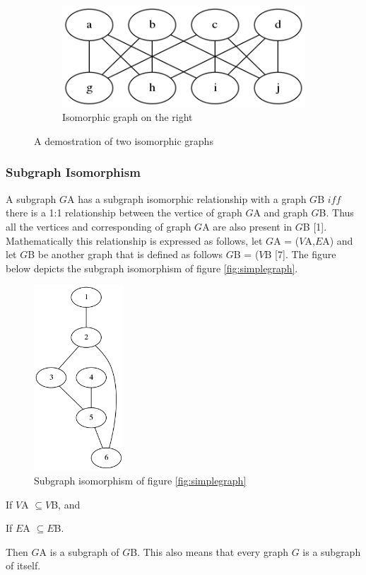 \begin{figure}[H]
\begin{subfigure}[b]{0.4\textwidth}
    \includegraphics[width=\textwidth]{isomorphismright}
    \caption{Isomorphic graph on the right}
    \label{fig:isomorphism}
  \end{subfigure}
  \caption{A demostration of two isomorphic graphs}
\end{figure}

\subsubsection{Subgraph Isomorphism}
A subgraph $G${\tiny A}  has a subgraph isomorphic relationship with a graph $G${\tiny B} $iff$ there is a 1:1 relationship between the vertice of graph 
$G${\tiny A} and graph $G${\tiny B}. Thus all the vertices and corresponding of graph $G${\tiny A} are also present in $G${\tiny B} [1]. Mathematically this
relationship is expressed as follows, let $G${\tiny A} = ($V${\tiny A},$E${\tiny A}) and let $G${\tiny B} be another graph that is defined as 
follows $G${\tiny B} = ($V${\tiny B} [7]. The figure below depicts the subgraph isomorphism of figure \ref{fig:simplegraph}.
\begin{figure}[H]
  \begin{center}
      \includegraphics[width=0.3\textwidth]{subgraph.png}
  \end{center}    
  \caption{Subgraph isomorphism of figure \ref{fig:simplegraph}}
  \label{fig:isomorphism_subgraph}
\end{figure}
\begin{myEnumerate}
  \item If $V${\tiny A} $ \subseteq V${\tiny B}, and
  \item If $E${\tiny A} $ \subseteq E${\tiny B}.
\end{myEnumerate}
Then $G${\tiny A} is a subgraph of $G${\tiny B}. This also means that every graph $G$ is a subgraph of itself.
\newpage